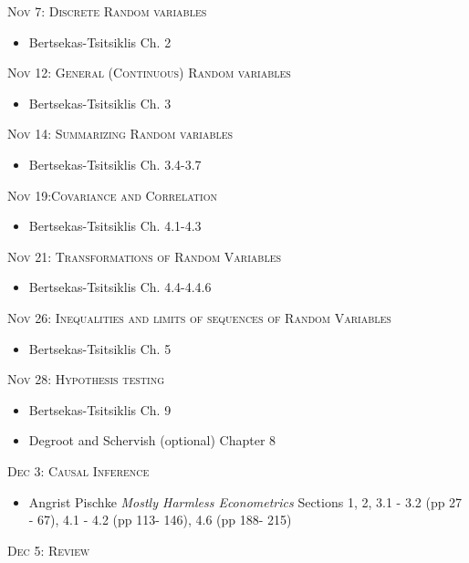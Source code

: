 \documentclass[11pt]{article}
\begin{document}
\noindent \textsc{Nov 7: Discrete Random variables }

\begin{itemize}

 \item Bertsekas-Tsitsiklis Ch. 2  
 


\end{itemize}


\noindent \textsc{Nov 12: General (Continuous) Random variables}

\begin{itemize}
\item Bertsekas-Tsitsiklis Ch. 3 

\end{itemize}


\noindent \textsc{Nov 14:  Summarizing Random variables}

\begin{itemize}
\item Bertsekas-Tsitsiklis Ch. 3.4-3.7 

\end{itemize}


\noindent \textsc{Nov 19:Covariance and Correlation}

\begin{itemize}
\item Bertsekas-Tsitsiklis Ch. 4.1-4.3

\end{itemize}

\noindent \textsc{Nov 21: Transformations of Random Variables }

\begin{itemize}

 \item Bertsekas-Tsitsiklis Ch. 4.4-4.4.6
 
 
\end{itemize}

\noindent \textsc{Nov 26:  Inequalities and limits of sequences of Random Variables}

\begin{itemize}

 \item  Bertsekas-Tsitsiklis Ch. 5


\end{itemize}

\noindent \textsc{Nov 28: Hypothesis testing}

\begin{itemize}

 \item Bertsekas-Tsitsiklis Ch. 9
  \item Degroot and Schervish (optional) Chapter 8

\end{itemize}

\noindent \textsc{Dec 3: Causal Inference}

\begin{itemize}

\item Angrist Pischke \emph{Mostly Harmless Econometrics} Sections 1, 2, 3.1 - 3.2 (pp 27 - 67), 4.1 - 4.2 (pp 113- 146), 4.6 (pp 188- 215)

\end{itemize}

\noindent \textsc{Dec 5: Review}
\end{document}

